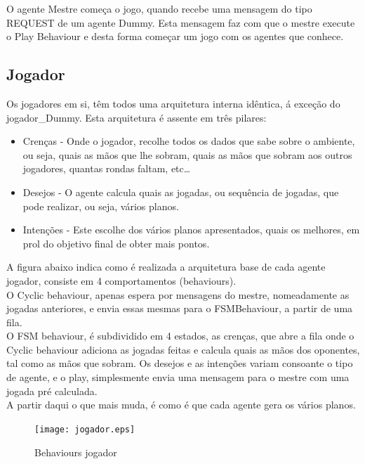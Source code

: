 \documentclass[12pt]{article}
\begin{document}
    O agente Mestre começa o jogo, quando recebe uma mensagem do tipo REQUEST de um agente Dummy. Esta mensagem faz com que o mestre execute o Play Behaviour e desta forma começar um jogo com os agentes que conhece.\\
	
	\subsection*{Jogador}
    Os jogadores em si, têm todos uma arquitetura interna idêntica, á exceção do jogador\_Dummy. Esta arquitetura é assente em três pilares:\\
	
	
	\begin{itemize}
        \item Crenças - Onde o jogador, recolhe todos os dados que sabe sobre o ambiente, ou seja, quais as mãos que lhe sobram, quais as mãos que sobram aos outros jogadores, quantas rondas faltam, etc…
        
        \item Desejos - O agente calcula quais as jogadas, ou sequência de jogadas, que pode realizar, ou seja, vários planos.
        
        \item Intenções - Este escolhe dos vários planos apresentados, quais os melhores, em prol do objetivo final de obter mais pontos.
    \end{itemize}

    
    A figura abaixo indica como é realizada a arquitetura base de cada agente jogador, consiste em 4 comportamentos (behaviours).\\
    O Cyclic behaviour, apenas espera por mensagens do mestre, nomeadamente as jogadas anteriores, e envia essas mesmas para o FSMBehaviour, a partir de uma fila.\\
    O FSM behaviour, é subdividido em 4 estados, as crenças, que abre a fila onde o Cyclic behaviour adiciona as jogadas feitas e calcula quais as mãos dos oponentes, tal como as mãos que sobram. Os desejos e as intenções variam consoante o tipo de agente, e o play, simplesmente envia uma mensagem para o mestre com uma jogada pré calculada.\\
    A partir daqui o que mais muda, é como é que cada agente gera os vários planos.\\

    \begin{figure}[h]
		\centering
        \texttt{[image: jogador.eps]}
		\caption{Behaviours jogador}
		\label{fig:jogador}
	\end{figure}
	
\end{document}
